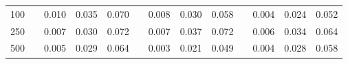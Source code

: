 % 
\begin{tabular}{ccccccccccccc}
  \hline
  \hline
100 &  & 0.010 & 0.035 & 0.070 &  & 0.008 & 0.030 & 0.058 &  & 0.004 & 0.024 & 0.052 \\ 
  250 &  & 0.007 & 0.030 & 0.072 &  & 0.007 & 0.037 & 0.072 &  & 0.006 & 0.034 & 0.064 \\ 
  500 &  & 0.005 & 0.029 & 0.064 &  & 0.003 & 0.021 & 0.049 &  & 0.004 & 0.028 & 0.058 \\ 
   \hline
\end{tabular}
